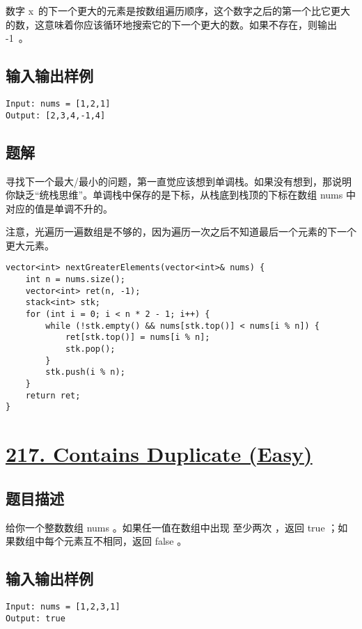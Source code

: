 \documentclass[lang=cn,10pt]{elegantbook}
\begin{document}
数字 x 的下一个更大的元素是按数组遍历顺序，这个数字之后的第一个比它更大的数，这意味着你应该循环地搜索它的下一个更大的数。如果不存在，则输出 -1 。

\subsection*{输入输出样例}

\begin{lstlisting}
Input: nums = [1,2,1]
Output: [2,3,4,-1,4]
\end{lstlisting}

\subsection*{题解}

寻找下一个最大/最小的问题，第一直觉应该想到单调栈。如果没有想到，那说明你缺乏“统栈思维”。单调栈中保存的是下标，从栈底到栈顶的下标在数组 nums 中对应的值是单调不升的。

注意，光遍历一遍数组是不够的，因为遍历一次之后不知道最后一个元素的下一个更大元素。

\begin{lstlisting}
vector<int> nextGreaterElements(vector<int>& nums) {
	int n = nums.size();
	vector<int> ret(n, -1);
	stack<int> stk;
	for (int i = 0; i < n * 2 - 1; i++) {
		while (!stk.empty() && nums[stk.top()] < nums[i % n]) {
			ret[stk.top()] = nums[i % n];
			stk.pop();
		}
		stk.push(i % n);
	}
	return ret;
}
\end{lstlisting}

{\color{red}\section{\href{https://leetcode.cn/problems/contains-duplicate/}{217. Contains Duplicate (Easy)}}} \label{ch11.217}

\subsection*{题目描述}

给你一个整数数组 nums 。如果任一值在数组中出现 至少两次 ，返回 true ；如果数组中每个元素互不相同，返回 false 。

\subsection*{输入输出样例}

\begin{lstlisting}
Input: nums = [1,2,3,1]
Output: true
\end{lstlisting}
\end{document}
